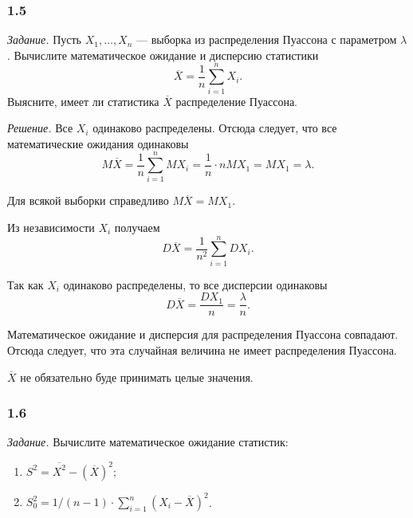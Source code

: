 \subsubsection*{1.5}

\textit{Задание.}
Пусть $X_1, \dotsc, X_n$ --- выборка из распределения Пуассона с параметром $ \lambda $.
Вычислите математическое ожидание и дисперсию статистики
$$ \overline{X} =
  \frac{1}{n} \sum \limits_{i = 1}^n X_i.$$
Выясните, имеет ли статистика $ \overline{X}$ распределение Пуассона.

\textit{Решение.} Все $X_i$ одинаково распределены.
Отсюда следует, что все математические ожидания одинаковы
$$M \overline{X} =
  \frac{1}{n} \sum \limits_{i = 1}^n MX_i =
  \frac{1}{n} \cdot nMX_1 =
  MX_1 =
  \lambda.$$

Для всякой выборки справедливо $M \overline{X} = MX_1$.

Из независимости $X_i$ получаем
$$D \overline{X} =
  \frac{1}{n^2} \sum \limits_{i = 1}^n DX_i.$$

Так как $X_i$ одинаково распределены, то все дисперсии одинаковы
$$D \overline{X} =
  \frac{DX_1}{n} =
  \frac{ \lambda }{n}.$$

Математическое ожидание и дисперсия для распределения Пуассона совпадают.
Отсюда следует, что эта случайная величина не имеет распределения Пуассона.

$ \overline{X}$ не обязательно буде принимать целые значения.

\subsubsection*{1.6}

\textit{Задание.} Вычислите математическое ожидание статистик:
\begin{enumerate}[label=\alph*)]
  \item $S^2 = \overline{X^2} - \left( \overline{X} \right)^2$;
  \item $S_0^2 =
          1 / \left( n - 1 \right) \cdot
          \sum \limits_{i = 1}^n \left( X_i - \overline{X} \right)^2$.
\end{enumerate}


